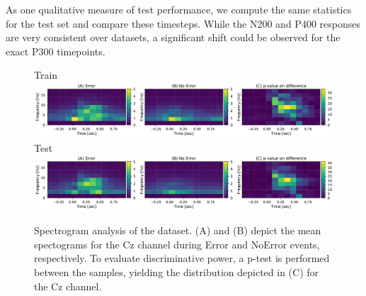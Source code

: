 \documentclass[10pt,a4paper]{article}
\begin{document}
As one qualitative measure of test performance, we compute the same statistics for the test set and compare these timesteps.
While the N200 and P400 responses are very consistent over datasets, a significant shift could be observed for the exact P300 timepoints.

\begin{figure}
    Train\\
    \includegraphics[width=\textwidth]{fig/spectrogram-train}
    Test\\
    \includegraphics[width=\textwidth]{fig/spectrogram-test}
    \caption{Spectrogram analysis of the dataset. (A) and (B) depict the mean spectograms for the Cz channel during Error and NoError events, respectively. To evaluate discriminative power, a p-test is performed between the samples, yielding the distribution depicted in (C) for the Cz channel.}
\end{figure}
\end{document}
